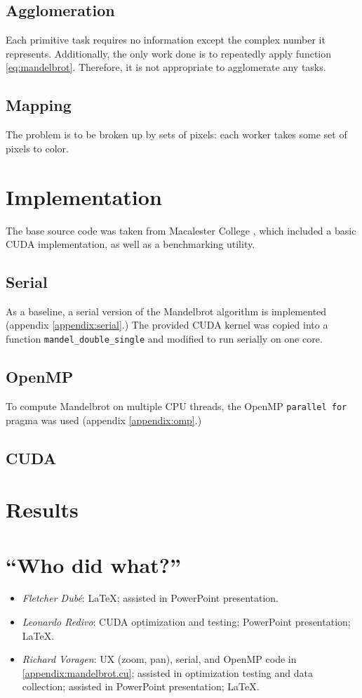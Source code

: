 \documentclass{article}
\begin{document}
\subsection{Agglomeration}
Each primitive task requires no information except the complex number it represents. Additionally, the only work done is to repeatedly apply function \ref{eq:mandelbrot}. Therefore, it is not appropriate to agglomerate any tasks.

\subsection{Mapping}
The problem is to be broken up by sets of pixels: each worker takes some set of pixels to color.


\section{Implementation} \label{sec:impl}
The base source code was taken from Macalester College \cite{mandel_orig}, which included a basic CUDA implementation, as well as a benchmarking utility.

\subsection{Serial}
As a baseline, a serial version of the Mandelbrot algorithm is implemented (appendix \ref{appendix:serial}.) The provided CUDA kernel was copied into a function \verb|mandel_double_single| and modified to run serially on one core.

\subsection{OpenMP}
To compute Mandelbrot on multiple CPU threads, the OpenMP \verb|parallel for| pragma was used (appendix \ref{appendix:omp}.)

\subsection{CUDA}



\section{Results}
\appendix
\pagebreak
\section{``Who did what?''}
\begin{itemize}
	\item \emph{Fletcher Dub\'e}: \LaTeX{}; assisted in PowerPoint presentation.

	\item \emph{Leonardo Redivo}: CUDA optimization and testing; PowerPoint presentation; \LaTeX{}.

	\item \emph{Richard Voragen}: UX (zoom, pan), serial, and OpenMP code in \ref{appendix:mandelbrot.cu}; assisted in optimization testing and data collection; assisted in PowerPoint presentation; \LaTeX{}.
\end{itemize}
\end{document}
